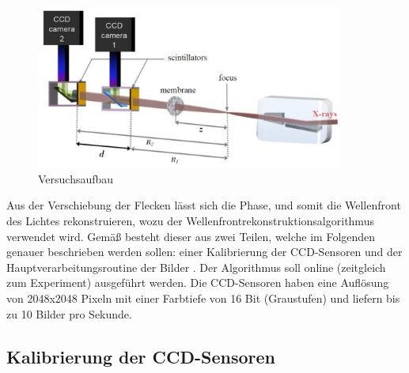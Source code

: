 \begin{figure}[htbp]
	\begin{center}
		\includegraphics[width=0.9\textwidth]{img/Versuchsaufbau}
		\caption[Versuchsaufbau]{Versuchsaufbau }
		\label{fig:versuch}
	\end{center}
\end{figure}

Aus der Verschiebung der Flecken lässt sich die Phase, und somit die Wellenfront des Lichtes rekonstruieren, wozu der Wellenfrontrekonstruktionsalgorithmus verwendet wird. Gemäß \citeauthor{Ber13} besteht dieser aus zwei Teilen, welche im Folgenden genauer beschrieben werden sollen: einer Kalibrierung der \gls{CCD}-Sensoren und der Hauptverarbeitungsroutine der Bilder . Der Algorithmus soll online (zeitgleich zum Experiment) ausgeführt werden. Die \gls{CCD}-Sensoren haben eine Auflösung von 2048x2048 Pixeln mit einer Farbtiefe von 16 Bit (Graustufen) und liefern bis zu 10 Bilder pro Sekunde.

\subsection{Kalibrierung der CCD-Sensoren}

